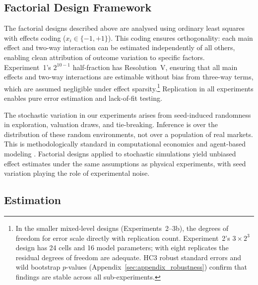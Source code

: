 \subsection{Factorial Design Framework}

The factorial designs described above are analysed using ordinary least squares with effects coding ($x_i \in \{-1, +1\}$). This coding ensures orthogonality: each main effect and two-way interaction can be estimated independently of all others, enabling clean attribution of outcome variation to specific factors. Experiment~1's $2^{10-1}$ half-fraction has Resolution~V, ensuring that all main effects and two-way interactions are estimable without bias from three-way terms, which are assumed negligible under effect sparsity.\footnote{In the smaller mixed-level designs (Experiments~2--3b), the degrees of freedom for error scale directly with replication count. Experiment~2's $3 \times 2^3$ design has 24 cells and 16 model parameters; with eight replicates the residual degrees of freedom are adequate. HC3 robust standard errors and wild bootstrap $p$-values (Appendix~\ref{sec:appendix_robustness}) confirm that findings are stable across all sub-experiments.} Replication in all experiments enables pure error estimation and lack-of-fit testing.

The stochastic variation in our experiments arises from seed-induced randomness in exploration, valuation draws, and tie-breaking. Inference is over the distribution of these random environments, not over a population of real markets. This is methodologically standard in computational economics and agent-based modeling \citep{Tesfatsion2006}. Factorial designs applied to stochastic simulations yield unbiased effect estimates under the same assumptions as physical experiments, with seed variation playing the role of experimental noise.

\subsection{Estimation}

